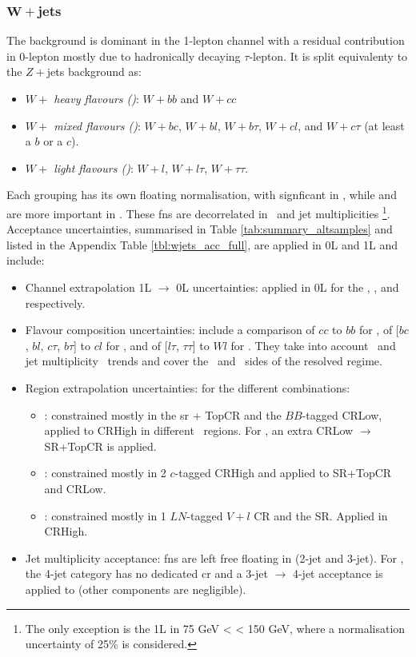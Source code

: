 \subsubsection{$\boldsymbol{W+}$jets}
The background is dominant in the 1-lepton channel with a residual contribution in 0-lepton mostly due to hadronically decaying $\tau$-lepton. It is split equivalenty to the $Z+$jets background as:   
\begin{itemize}
    \item \textit{$W+$ heavy flavours (\whf)}: $W+bb$ and $W+cc$
    \item \textit{$W+$ mixed flavours (\wmf)}: $W+bc$, $W+bl$, $W+b\tau$, $W+cl$, and $W+c\tau$ (at least a $b$ or a $c$).
    \item \textit{$W+$ light flavours (\wlf)}: $W+l$, $W+l\tau$, $W+\tau\tau$.
\end{itemize}
Each grouping has its own floating normalisation, with \whf signficant in \vhb, while \wmf and \wlf are more important in \vhc. These \gls{fn}s are decorrelated in \ptv\ and jet multiplicities \nj\footnote{The only exception is the 1L \wlf in 75 GeV < \ptv < 150 GeV, where a normalisation uncertainty of 25\% is considered.}. Acceptance uncertainties, summarised in Table \ref{tab:summary_altsamples} and listed in the Appendix Table \ref{tbl:wjets_acc_full}, are applied in 0L and 1L and include:
\begin{itemize}[leftmargin=*]
    \item Channel extrapolation 1L $\rightarrow$ 0L uncertainties: applied in 0L for the \whf, \wmf, and \wlf respectively. 
    \item Flavour composition uncertainties: include a comparison of $cc$ to $bb$ for \whf, of [$bc$, $bl$, $c\tau$, $b\tau$] to $cl$ for \wmf, and of [$l\tau$, $\tau\tau$] to $Wl$ for \wlf. They take into account \ptv\ and jet multiplicity \nj\ trends and cover the \vhb\ and \vhc\ sides of the resolved regime. 
    \item Region extrapolation uncertainties: for the different combinations:
    \begin{itemize}
        \item \whf: constrained mostly in the \gls{sr} + TopCR and the $BB$-tagged CRLow, applied to CRHigh in different \ptv\ regions. For \vhb, an extra CRLow $\rightarrow$ SR+TopCR is applied. 
        \item \wmf: constrained mostly in 2 $c$-tagged CRHigh and applied to SR+TopCR and CRLow.
        \item \wlf: constrained mostly in 1 $LN$-tagged $V+l$ CR and the SR. Applied in CRHigh. %
    \end{itemize}
    \item Jet multiplicity \nj acceptance: \gls{fn}s are left free floating in \nj (2-jet and 3-jet). For \vhb, the 4-jet category has no dedicated \gls{cr} and a 3-jet $\rightarrow$ 4-jet acceptance is applied to \whf (other components are negligible).
\end{itemize}

